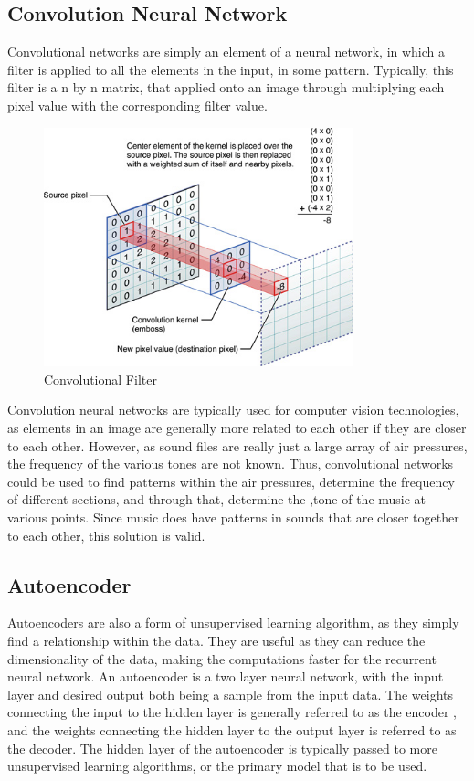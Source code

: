 \documentclass{article}
\begin{document}
\subsection{Convolution Neural Network}
Convolutional networks are simply an element of a neural network, in which a
filter is applied to all the elements in the input, in some pattern. Typically,
this filter is a n by n matrix, that applied onto an image through multiplying
each pixel value with the corresponding filter value. 
\begin{figure}[H]
	\centering
	\caption{Convolutional Filter}
	\includegraphics[width=0.8\textwidth]{convolutionFilter.jpg}
\end{figure}
Convolution neural networks are typically used for computer vision technologies,
as elements in an image are generally more related to each other if they are
closer to each other. However, as sound files are really just a large array of
air pressures, the frequency of the various tones are not known. Thus,
convolutional networks could be used to find patterns within the air pressures,
determine the frequency of different sections, and through that, determine the
,tone of the music at various points. Since music does have patterns in sounds
that are closer together to each other, this solution is valid.

\subsection{Autoencoder}
Autoencoders are also a form of unsupervised learning algorithm, as they simply
find a relationship within the data. They are useful as they can reduce the
dimensionality of the data, making the computations faster for the recurrent
neural network. An autoencoder is a two layer neural network, with the input
layer and desired output both being a sample from the input data. The weights
connecting the input to the hidden layer is generally referred to as the encoder
, and the weights connecting the hidden layer to the output layer is referred to
as the decoder. The hidden layer of the autoencoder is typically passed to more
unsupervised learning algorithms, or the primary model that is to be used.
\end{document}
